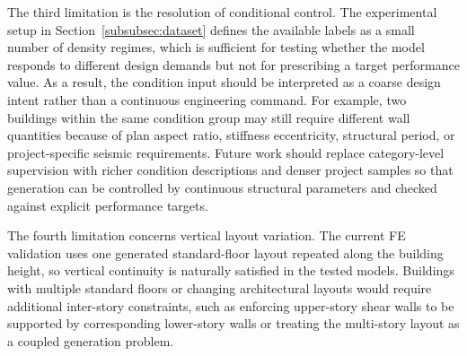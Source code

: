 The third limitation is the resolution of conditional control. The experimental setup in Section~\ref{subsubsec:dataset} defines the available labels as a small number of density regimes, which is sufficient for testing whether the model responds to different design demands but not for prescribing a target performance value. As a result, the condition input should be interpreted as a coarse design intent rather than a continuous engineering command. For example, two buildings within the same condition group may still require different wall quantities because of plan aspect ratio, stiffness eccentricity, structural period, or project-specific seismic requirements. Future work should replace category-level supervision with richer condition descriptions and denser project samples so that generation can be controlled by continuous structural parameters and checked against explicit performance targets.

The fourth limitation concerns vertical layout variation. The current FE validation uses one generated standard-floor layout repeated along the building height, so vertical continuity is naturally satisfied in the tested models. Buildings with multiple standard floors or changing architectural layouts would require additional inter-story constraints, such as enforcing upper-story shear walls to be supported by corresponding lower-story walls or treating the multi-story layout as a coupled generation problem.
